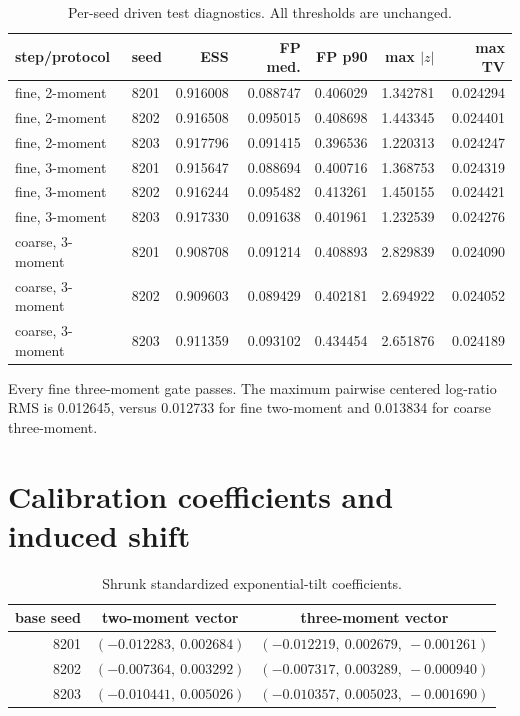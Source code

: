 \documentclass[11pt]{article}
\begin{document}
\begin{table}[h]
\centering\small
\caption{Per-seed driven test diagnostics.  All thresholds are unchanged.}
\begin{tabular}{@{}llrrrrr@{}}
\toprule
step/protocol & seed & ESS & FP med. & FP p90 & max $|z|$ & max TV\\
\midrule
fine, 2-moment & 8201 & 0.916008 & 0.088747 & 0.406029 & 1.342781 & 0.024294\\
fine, 2-moment & 8202 & 0.916508 & 0.095015 & 0.408698 & 1.443345 & 0.024401\\
fine, 2-moment & 8203 & 0.917796 & 0.091415 & 0.396536 & 1.220313 & 0.024247\\
\midrule
fine, 3-moment & 8201 & 0.915647 & 0.088694 & 0.400716 & 1.368753 & 0.024319\\
fine, 3-moment & 8202 & 0.916244 & 0.095482 & 0.413261 & 1.450155 & 0.024421\\
fine, 3-moment & 8203 & 0.917330 & 0.091638 & 0.401961 & 1.232539 & 0.024276\\
\midrule
coarse, 3-moment & 8201 & 0.908708 & 0.091214 & 0.408893 & 2.829839 & 0.024090\\
coarse, 3-moment & 8202 & 0.909603 & 0.089429 & 0.402181 & 2.694922 & 0.024052\\
coarse, 3-moment & 8203 & 0.911359 & 0.093102 & 0.434454 & 2.651876 & 0.024189\\
\bottomrule
\end{tabular}
\end{table}

Every fine three-moment gate passes.  The maximum pairwise centered log-ratio
RMS is 0.012645, versus 0.012733 for fine two-moment and 0.013834 for coarse
three-moment.

\section{Calibration coefficients and induced shift}

\begin{table}[h]
\centering\small
\caption{Shrunk standardized exponential-tilt coefficients.}
\begin{tabular}{@{}rcc@{}}
\toprule
base seed & two-moment vector & three-moment vector\\
\midrule
8201 & $(-0.012283,\ 0.002684)$ & $(-0.012219,\ 0.002679,\ -0.001261)$\\
8202 & $(-0.007364,\ 0.003292)$ & $(-0.007317,\ 0.003289,\ -0.000940)$\\
8203 & $(-0.010441,\ 0.005026)$ & $(-0.010357,\ 0.005023,\ -0.001690)$\\
\bottomrule
\end{tabular}
\end{table}
\end{document}
